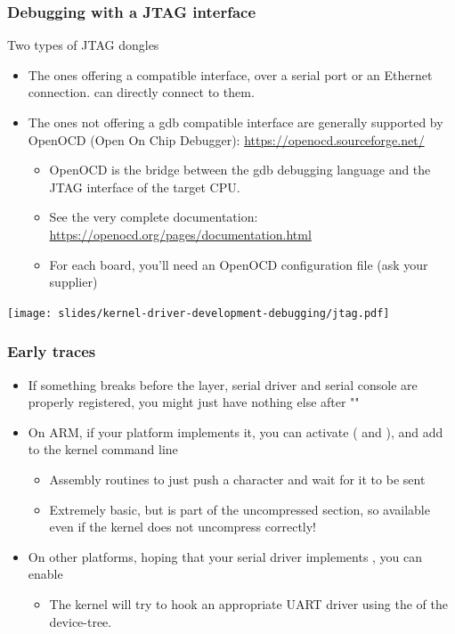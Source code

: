\begin{frame}
  \frametitle{Debugging with a JTAG interface}
  Two types of JTAG dongles
  \begin{itemize}
  \item The ones offering a  compatible interface, over a
    serial port or an Ethernet connection.  can directly
    connect to them.
  \item The ones not offering a gdb compatible interface are generally
    supported by OpenOCD (Open On Chip Debugger):
    \url{https://openocd.sourceforge.net/}
    \begin{itemize}
    \item OpenOCD is the bridge between the gdb debugging language
      and the JTAG interface of the target CPU.
    \item See the very complete documentation:
      \url{https://openocd.org/pages/documentation.html}
    \item For each board, you'll need an OpenOCD configuration file
      (ask your supplier)
    \end{itemize}
  \end{itemize}
   \begin{center}
     \texttt{[image: slides/kernel-driver-development-debugging/jtag.pdf]}
   \end{center}
\end{frame}

\begin{frame}
  \frametitle{Early traces}
  \begin{itemize}
  \item If something breaks before the  layer, serial driver
    and serial console are properly registered, you might just have
    nothing else after ""
  \item On ARM, if your platform implements it, you can activate
    ( and ), and add
     to the kernel command line
    \begin{itemize}
    \item Assembly routines to just push a character and wait for it to
      be sent
    \item Extremely basic, but is part of the uncompressed section, so
      available even if the kernel does not uncompress correctly!
    \end{itemize}
  \item On other platforms, hoping that your serial driver implements
    , you can enable 
    \begin{itemize}
    \item The kernel will try to hook an appropriate 
      UART driver using the  of the device-tree.
    \end{itemize}
  \end{itemize}
\end{frame}

